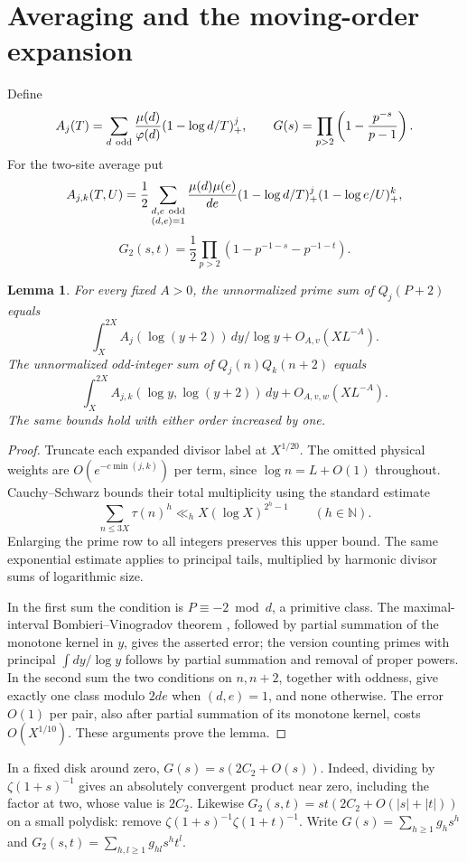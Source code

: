 \documentclass[11pt]{article}
\newtheorem{lemma}[theorem]{Lemma}
\newcommand{\NN}{\mathbb N}
\begin{document}
\section{Averaging and the moving-order expansion}
Define
\[
 A_j(T)=\sum_{d\ \rm odd}\frac{\mu(d)}{\varphi(d)}(1-\log d/T)_+^j,
 \qquad G(s)=\prod_{p>2}\left(1-\frac{p^{-s}}{p-1}\right).
\]
For the two-site average put
\[
 A_{j,k}(T,U)=\frac12\sum_{\substack{d,e\ {\rm odd}\\(d,e)=1}}
   \frac{\mu(d)\mu(e)}{de}(1-\log d/T)_+^j(1-\log e/U)_+^k,
 \]
\[
 G_2(s,t)=\frac12\prod_{p>2}(1-p^{-1-s}-p^{-1-t}).
\]

\begin{lemma}\label{lem:replace}
For every fixed \(A>0\), the unnormalized prime sum of \(Q_j(P+2)\) equals
\[\int_X^{2X} A_j(\log(y+2))\,dy/\log y+O_{A,v}(X L^{-A}).\]
The unnormalized odd-integer sum of \(Q_j(n)Q_k(n+2)\) equals
\[\int_X^{2X}A_{j,k}(\log y,\log(y+2))\,dy+O_{A,v,w}(X L^{-A}).\]
The same bounds hold with either order increased by one.
\end{lemma}
\begin{proof}
Truncate each expanded divisor label at \(X^{1/20}\). The omitted physical weights are \(O(e^{-c\min(j,k)})\) per term, since \(\log n=L+O(1)\) throughout. Cauchy--Schwarz bounds their total multiplicity using the standard estimate \[\sum_{n\le 3X}\tau(n)^h\ll_h X(\log X)^{2^h-1}\qquad(h\in\NN).\] Enlarging the prime row to all integers preserves this upper bound. The same exponential estimate applies to principal tails, multiplied by harmonic divisor sums of logarithmic size.

In the first sum the condition is \(P\equiv-2\bmod d\), a primitive class. The maximal-interval Bombieri--Vinogradov theorem \cite{BV}, followed by partial summation of the monotone kernel in \(y\), gives the asserted error; the version counting primes with principal \(\int dy/\log y\) follows by partial summation and removal of proper powers. In the second sum the two conditions on \(n,n+2\), together with oddness, give exactly one class modulo \(2de\) when \((d,e)=1\), and none otherwise. The error \(O(1)\) per pair, also after partial summation of its monotone kernel, costs \(O(X^{1/10})\). These arguments prove the lemma.
\end{proof}

In a fixed disk around zero, \(G(s)=s(2C_2+O(s))\). Indeed, dividing by \(\zeta(1+s)^{-1}\) gives an absolutely convergent product near zero, including the factor at two, whose value is \(2C_2\). Likewise \(G_2(s,t)=st(2C_2+O(|s|+|t|))\) on a small polydisk: remove \(\zeta(1+s)^{-1}\zeta(1+t)^{-1}\). Write \(G(s)=\sum_{h\ge1}g_hs^h\) and \(G_2(s,t)=\sum_{h,l\ge1}g_{hl}s^ht^l\).
\end{document}
